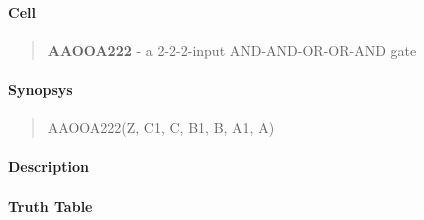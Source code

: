 \label{AAOOA222}
\paragraph{Cell}
\begin{quote}
    \textbf{AAOOA222} - a 2-2-2-input AND-AND-OR-OR-AND gate
\end{quote}

\paragraph{Synopsys}
\begin{quote}
    AAOOA222(Z, C1, C, B1, B, A1, A)
\end{quote}

\paragraph{Description}

%

\paragraph{Truth Table}
%

